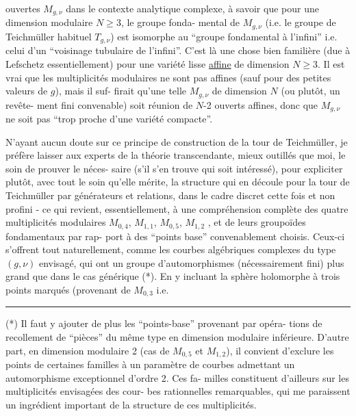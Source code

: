 
 ouvertes $M_{g,\nu}$ dans le contexte analytique complexe,
à savoir que pour une dimension modulaire $N \geq 3$, le groupe fonda-%
mental de $M_{g,\nu}$ (i.e. le groupe de Teichmüller habituel $T_{g,\nu}$)
est isomorphe au ``groupe fondamental à l'infini'' i.e. celui d'un
``voisinage tubulaire de l'infini''. C'est là une chose bien familière
(due à Lefschetz essentiellement) pour une variété lisse \uline{affine} de
dimension $N \geq 3$. Il est vrai que les multiplicités modulaires ne
sont pas affines (sauf pour des petites valeurs de $g$), mais il suf-%
firait qu'une telle $M_{g,\nu}$ de dimension $N$ (ou plutôt, un revête-%
\margin{\unsure{$\frown$}}ment fini convenable) soit réunion de $N$-2 ouverts affines, donc
que $M_{g,\nu}$ ne soit pas ``trop proche d'une variété compacte''.

N'ayant aucun doute sur ce principe de construction de la
tour de Teichmüller, je préfère laisser aux experts de la théorie
transcendante, mieux outillés que moi, le soin de prouver le néces-%
saire (s'il s'en trouve qui soit intéressé), pour expliciter plutôt,
avec tout le soin qu'elle mérite, la structure qui en découle pour
la tour de Teichmüller par générateurs et relations, dans le cadre
discret cette fois et non profini - ce qui revient, essentiellement,
à une compréhension complète des quatre multiplicités modulaires
$M_{0,4}$, $M_{1,1}$, $M_{0,5}$, $M_{1,2}$ , et de leurs groupoïdes fondamentaux par rap-%
port à des ``points base'' convenablement choisis. Ceux-ci s'offrent
tout naturellement, comme les courbes algébriques complexes du type
$(g,\nu)$ envisagé, qui ont un groupe d'automorphismes (nécessairement
fini) plus grand que dans le cas générique (*). En y incluant la
sphère holomorphe à trois points marqués (provenant de $M_{0,3}$ i.e.

\rule{4cm}{0.4pt}

(*) Il faut y ajouter de plus les ``points-base'' provenant par opéra-%
tions de recollement de ``pièces'' du même type en dimension modulaire
inférieure. D'autre part, en dimension modulaire 2 (cas de $M_{0,5}$ et $M_{1,2}$),
il convient d'exclure les points de certaines familles à un paramètre
de courbes admettant un automorphisme exceptionnel d'ordre 2. Ces fa-%
milles constituent d'ailleurs sur les multiplicités envisagées des cour-%
bes rationnelles remarquables, qui me paraissent un ingrédient important
de la structure de ces multiplicités.

